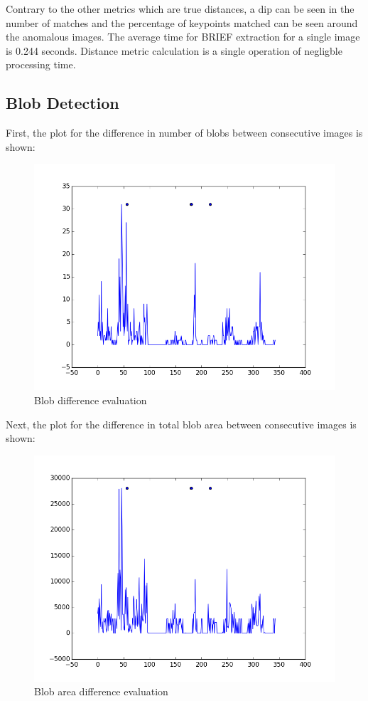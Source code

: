 Contrary to the other metrics which are true distances, a dip can be seen in the number of matches and the percentage of keypoints matched can be seen around the anomalous images.
The average time for BRIEF extraction for a single image is 0.244 seconds.
Distance metric calculation is a single operation of negligble processing time.

\subsection{Blob Detection}

First, the plot for the difference in number of blobs between consecutive images is shown:

\begin{figure}[h]
\centering
\includegraphics[scale=.50]{figures/blobdiffstest}
\caption{Blob difference evaluation}
\label{fig:tamu-fig3}
\end{figure}

Next, the plot for the difference in total blob area between consecutive images is shown:

\begin{figure}[h]
\centering
\includegraphics[scale=.50]{figures/blobareadiffstest}
\caption{Blob area difference evaluation}
\label{fig:tamu-fig3}
\end{figure}

